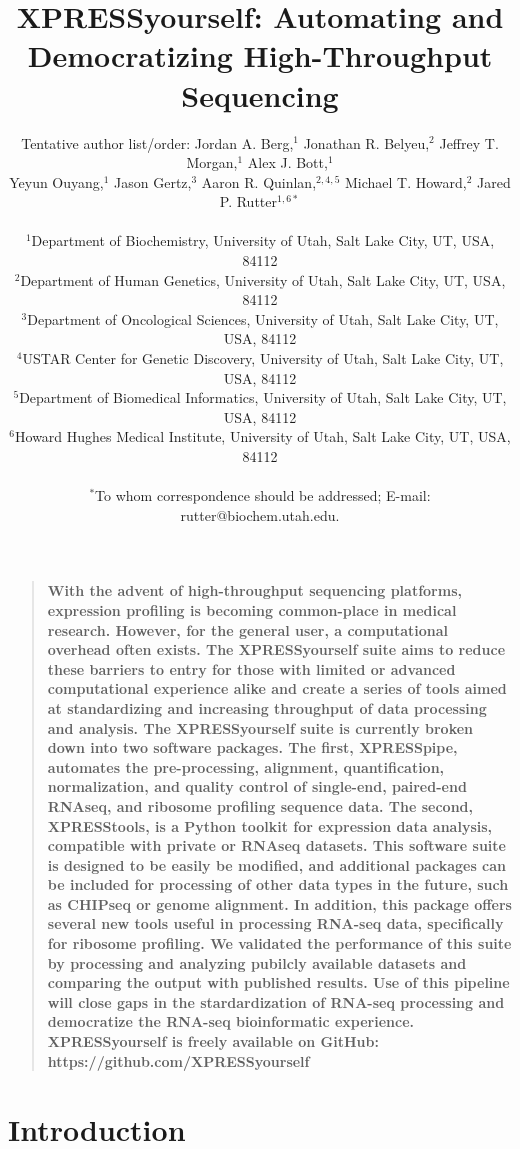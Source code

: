 \documentclass[11pt, a4paper, oneside]{article}
\title{
XPRESSyourself: Automating and Democratizing High-Throughput Sequencing
}
\author{
Tentative author list/order:
Jordan A. Berg,$^{1}$ Jonathan R. Belyeu,$^{2}$ Jeffrey T. Morgan,$^{1}$ Alex J. Bott,$^{1}$ \\
Yeyun Ouyang,$^{1}$ Jason Gertz,$^{3}$ Aaron R. Quinlan,$^{2,4,5}$ Michael T. Howard,$^{2}$ Jared P. Rutter$^{1,6\ast}$\\
\\
\normalsize{$^{1}$Department of Biochemistry, University of Utah, Salt Lake City, UT, USA, 84112}\\
\normalsize{$^{2}$Department of Human Genetics, University of Utah, Salt Lake City, UT, USA, 84112}\\
\normalsize{$^{3}$Department of Oncological Sciences, University of Utah, Salt Lake City, UT, USA, 84112}\\
\normalsize{$^{4}$USTAR Center for Genetic Discovery, University of Utah, Salt Lake City, UT, USA, 84112}\\
\normalsize{$^{5}$Department of Biomedical Informatics, University of Utah, Salt Lake City, UT, USA, 84112}\\
\normalsize{$^{6}$Howard Hughes Medical Institute, University of Utah, Salt Lake City, UT, USA, 84112}\\
\\
\normalsize{$^\ast$To whom correspondence should be addressed; E-mail: rutter@biochem.utah.edu.}
}
\date{}
\newenvironment{sciabstract}{%
\begin{quote} \bf}
{\end{quote}}
\begin{document}
\baselineskip24pt

\maketitle



\begin{sciabstract}
With the advent of high-throughput sequencing platforms, expression profiling is becoming common-place in medical research. However, for the general user, a computational overhead often exists. The XPRESSyourself suite aims to reduce these barriers to entry for those with limited or advanced computational experience alike and create a series of tools aimed at standardizing and increasing throughput of data processing and analysis. The XPRESSyourself suite is currently broken down into two software packages. The first, XPRESSpipe, automates the pre-processing, alignment, quantification, normalization, and quality control of single-end, paired-end RNAseq, and ribosome profiling sequence data. The second, XPRESStools, is a Python toolkit for expression data analysis, compatible with private or RNAseq datasets. This software suite is designed to be easily be modified, and additional packages can be included for processing of other data types in the future, such as CHIPseq or genome alignment. In addition, this package offers several new tools useful in processing RNA-seq data, specifically for ribosome profiling. We validated the performance of this suite by processing and analyzing pubilcly available datasets and comparing the output with published results. Use of this pipeline will close gaps in the stardardization of RNA-seq processing and democratize the RNA-seq bioinformatic experience.
\newline\\
\normalfont XPRESSyourself is freely available on GitHub: https://github.com/XPRESSyourself\\
\end{sciabstract}


\section{Introduction}
\end{document}
